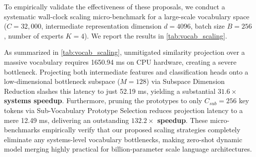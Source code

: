 To empirically validate the effectiveness of these proposals, we conduct a systematic wall-clock scaling micro-benchmark for a large-scale vocabulary space ($C = 32,000$, intermediate representation dimension $d = 4096$, batch size $B = 256$, number of experts $K = 4$). We report the results in \cref{tab:vocab_scaling}.

\begin{table}[h]
\caption{Vocabulary projection latency (ms) under varying mitigation strategies ($B=256$, $C=32,000$, $d=4,096$, $K=4$). Both proposed strategies achieve substantial, order-of-magnitude systems speedups, rendering similarity routing completely viable at LLM-scale.}
\label{tab:vocab_scaling}
\vskip 0.1in
\begin{center}
\begin{small}
\end{small}
\end{center}
\vskip -0.1in
\end{table}

As summarized in \cref{tab:vocab_scaling}, unmitigated similarity projection over a massive vocabulary requires 1650.94 ms on CPU hardware, creating a severe bottleneck. Projecting both intermediate features and classification heads onto a low-dimensional bottleneck subspace ($M=128$) via Subspace Dimension Reduction slashes this latency to just 52.19 ms, yielding a substantial \textbf{$31.6\times$ systems speedup}. Furthermore, pruning the prototypes to only $C_{sub}=256$ key tokens via Sub-Vocabulary Prototype Selection reduces projection latency to a mere 12.49 ms, delivering an outstanding \textbf{$132.2\times$ speedup}. These micro-benchmarks empirically verify that our proposed scaling strategies completely eliminate any systems-level vocabulary bottlenecks, making zero-shot dynamic model merging highly practical for billion-parameter scale language architectures.

